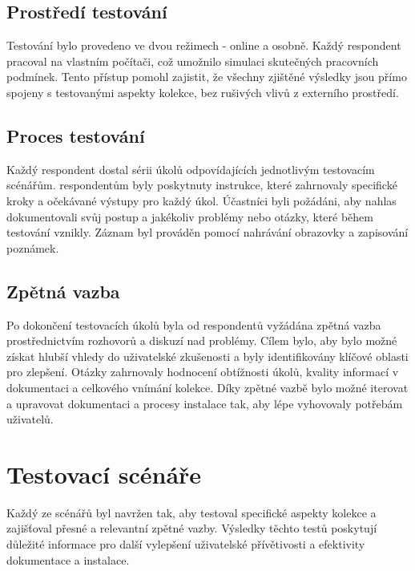 \subsection{Prostředí testování}
Testování bylo provedeno ve dvou režimech - online a osobně. Každý respondent pracoval na vlastním počítači, což umožnilo simulaci skutečných pracovních podmínek. Tento přístup pomohl zajistit, že všechny zjištěné výsledky jsou přímo spojeny s testovanými aspekty kolekce, bez rušivých vlivů z externího prostředí.

\subsection{Proces testování}
Každý respondent dostal sérii úkolů odpovídajících jednotlivým testovacím scénářům. respondentům byly poskytnuty instrukce, které zahrnovaly specifické kroky a očekávané výstupy pro každý úkol. Účastníci byli požádáni, aby nahlas dokumentovali svůj postup a jakékoliv problémy nebo otázky, které během testování vznikly. Záznam byl prováděn pomocí nahrávání obrazovky a zapisování poznámek.

\subsection{Zpětná vazba}
Po dokončení testovacích úkolů byla od respondentů vyžádána zpětná vazba prostřednictvím rozhovorů a diskuzí nad problémy. Cílem bylo, aby bylo možné získat hlubší vhledy do uživatelské zkušenosti a byly identifikovány klíčové oblasti pro zlepšení. Otázky zahrnovaly hodnocení obtížnosti úkolů, kvality informací v dokumentaci a celkového vnímání kolekce. Díky zpětné vazbě bylo možné iterovat a upravovat dokumentaci a procesy instalace tak, aby lépe vyhovovaly potřebám uživatelů.

\section{Testovací scénáře}
Každý ze scénářů byl navržen tak, aby testoval specifické aspekty kolekce a zajišťoval přesné a relevantní zpětné vazby. Výsledky těchto testů poskytují důležité informace pro další vylepšení uživatelské přívětivosti a efektivity dokumentace a instalace.

